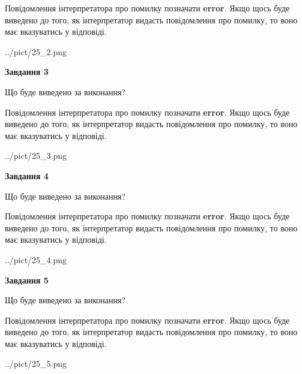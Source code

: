 \documentclass[12pt, ukrainian]{article}
\begin{document}
{\begin {large}
Повідомлення інтерпретатора про помилку позначати \textbf{error}.
Якщо щось буде виведено до того, як інтерпретатор видасть повідомлення про помилку, 
то воно має вказуватись у відповіді. \par


\begin{center}
	{../pict/25_2.png}
\end{center}
\newpage

{\begin {center}\textbf{Завдання 3}\end {center}}\par
Що буде виведено за виконання?

Повідомлення інтерпретатора про помилку позначати \textbf{error}.
Якщо щось буде виведено до того, як інтерпретатор видасть повідомлення про помилку, 
то воно має вказуватись у відповіді. \par


\begin{center}
	{../pict/25_3.png}
\end{center}
\newpage

{\begin {center}\textbf{Завдання 4}\end {center}}\par
Що буде виведено за виконання?

Повідомлення інтерпретатора про помилку позначати \textbf{error}.
Якщо щось буде виведено до того, як інтерпретатор видасть повідомлення про помилку, 
то воно має вказуватись у відповіді. \par


\begin{center}
	{../pict/25_4.png}
\end{center}
\newpage

{\begin {center}\textbf{Завдання 5}\end {center}}\par
Що буде виведено за виконання?

Повідомлення інтерпретатора про помилку позначати \textbf{error}.
Якщо щось буде виведено до того, як інтерпретатор видасть повідомлення про помилку, 
то воно має вказуватись у відповіді. \par


\begin{center}
	{../pict/25_5.png}
\end{center}
\newpage


\end{large}}
\end{document}
